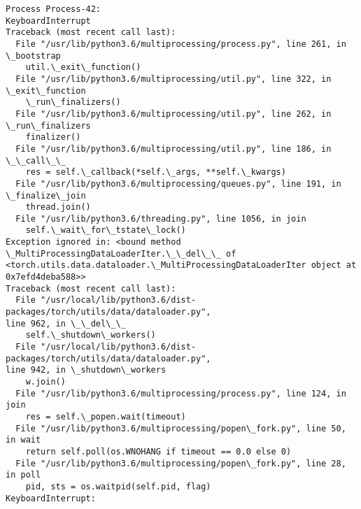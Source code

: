 \documentclass[10pt]{article}
\begin{document}
    \begin{Verbatim}[commandchars=\\\{\}]
Process Process-42:
KeyboardInterrupt
Traceback (most recent call last):
  File "/usr/lib/python3.6/multiprocessing/process.py", line 261, in \_bootstrap
    util.\_exit\_function()
  File "/usr/lib/python3.6/multiprocessing/util.py", line 322, in \_exit\_function
    \_run\_finalizers()
  File "/usr/lib/python3.6/multiprocessing/util.py", line 262, in
\_run\_finalizers
    finalizer()
  File "/usr/lib/python3.6/multiprocessing/util.py", line 186, in \_\_call\_\_
    res = self.\_callback(*self.\_args, **self.\_kwargs)
  File "/usr/lib/python3.6/multiprocessing/queues.py", line 191, in
\_finalize\_join
    thread.join()
  File "/usr/lib/python3.6/threading.py", line 1056, in join
    self.\_wait\_for\_tstate\_lock()
Exception ignored in: <bound method \_MultiProcessingDataLoaderIter.\_\_del\_\_ of
<torch.utils.data.dataloader.\_MultiProcessingDataLoaderIter object at
0x7efd4deba588>>
Traceback (most recent call last):
  File "/usr/local/lib/python3.6/dist-packages/torch/utils/data/dataloader.py",
line 962, in \_\_del\_\_
    self.\_shutdown\_workers()
  File "/usr/local/lib/python3.6/dist-packages/torch/utils/data/dataloader.py",
line 942, in \_shutdown\_workers
    w.join()
  File "/usr/lib/python3.6/multiprocessing/process.py", line 124, in join
    res = self.\_popen.wait(timeout)
  File "/usr/lib/python3.6/multiprocessing/popen\_fork.py", line 50, in wait
    return self.poll(os.WNOHANG if timeout == 0.0 else 0)
  File "/usr/lib/python3.6/multiprocessing/popen\_fork.py", line 28, in poll
    pid, sts = os.waitpid(self.pid, flag)
KeyboardInterrupt:
    \end{Verbatim}
\end{document}
